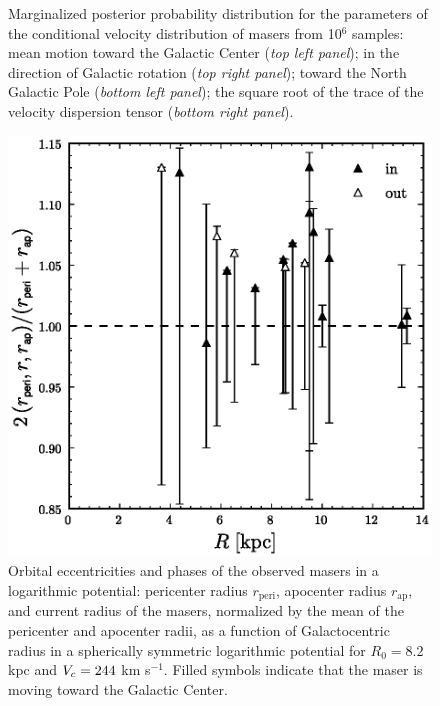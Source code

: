 \begin{figure}
\caption[Marginalized posterior probability distribution for the
  parameters of the conditional velocity distribution of
  masers]{Marginalized posterior probability distribution for the
  parameters of the conditional velocity distribution of masers from
  10$^6$ samples: mean motion toward the Galactic Center (\emph{top
    left panel}); in the direction of Galactic rotation (\emph{top
    right panel}); toward the North Galactic Pole (\emph{bottom left
    panel}); the square root of the trace of the velocity dispersion
  tensor (\emph{bottom right panel}).}\label{fig:dist}
\end{figure}

\clearpage
\begin{figure}
\includegraphics[width=.45\textwidth]{figs_masers/rrperirap.eps}
\caption[Orbital eccentricities and phases of the observed
  masers]{Orbital eccentricities and phases of the observed masers in
  a logarithmic potential: pericenter radius $r_{\mathrm{peri}}$,
  apocenter radius $r_{\mathrm{ap}}$, and current radius of the
  masers, normalized by the mean of the pericenter and apocenter
  radii, as a function of Galactocentric radius in a spherically
  symmetric logarithmic potential for $R_0 = 8.2$ kpc and $V_c = 244$
  km s$^{-1}$. Filled symbols indicate that the maser is moving toward
  the Galactic Center.}\label{fig:phases}
\end{figure}


